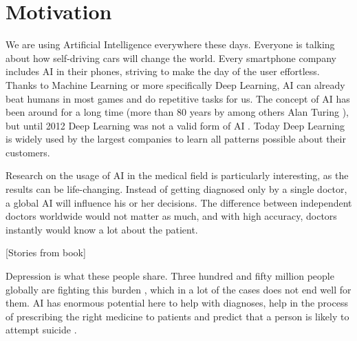 
\section{Motivation}

We are using Artificial Intelligence everywhere these days. Everyone is talking about how self-driving cars will change the world. Every smartphone company includes AI in their phones, striving to make the day of the user effortless. Thanks to Machine Learning or more specifically Deep Learning, AI can already beat humans in most games and do repetitive tasks for us. The concept of AI has been around for a long time (more than 80 years by among others Alan Turing \cite{turing1938}), but until 2012 Deep Learning was not a valid form of AI \cite{topol2019}. Today Deep Learning is widely used by the largest companies to learn all patterns possible about their customers. 

Research on the usage of AI in the medical field is particularly interesting, as the results can be life-changing. Instead of getting diagnosed only by a single doctor, a global AI will influence his or her decisions. The difference between independent doctors worldwide would not matter as much, and with high accuracy, doctors instantly would know a lot about the patient. 

[Stories from book]

Depression is what these people share. Three hundred and fifty million people globally are fighting this burden \cite{burden_of_depression}, which in a lot of the cases does not end well for them. AI has enormous potential here to help with diagnoses, help in the process of prescribing the right medicine to patients and predict that a person is likely to attempt suicide \cite{topol2019}. 